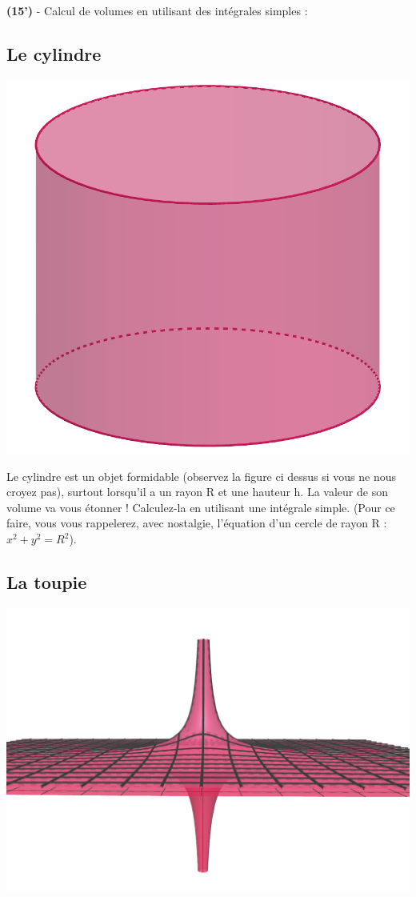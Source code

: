\documentclass[10pt,a4paper,notitlepage]{article}
\begin{document}
\begin{definition}
\hspace{0ex} \textbf{(15')} - Calcul de volumes en utilisant des intégrales simples :

\subsection*{Le cylindre}
\includegraphics[scale=.15]{cylindre}

Le cylindre est un objet formidable (observez la figure ci dessus si vous ne nous croyez pas), surtout lorsqu'il a un rayon R et une hauteur h. La valeur de son volume va vous étonner ! Calculez-la en utilisant une intégrale simple. (Pour ce faire, vous vous rappelerez, avec nostalgie, l'équation d'un cercle de rayon R : $x^2+y^2=R^2$).


\subsection*{La toupie}
\includegraphics[scale=.15]{toupie}


\end{definition}
\end{document}
